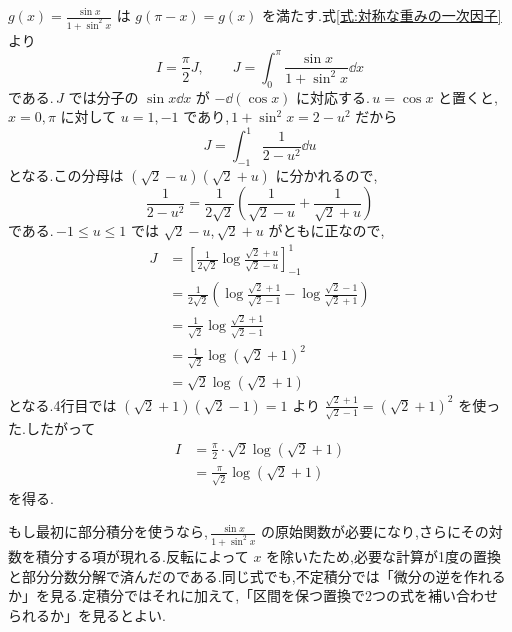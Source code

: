 $g(x)=\frac{\sin x}{1+\sin^2x}$ は $g(\pi-x)=g(x)$ を満たす.式\eqref{式:対称な重みの一次因子}より
\[
I=\frac{\pi}{2}J,\qquad
J=\int_0^\pi\frac{\sin x}{1+\sin^2x}\dd x
\]
である.\,$J$ では分子の $\sin x\dd x$ が $-\dd(\cos x)$ に対応する.\,$u=\cos x$ と置くと,\,$x=0,\pi$ に対して $u=1,-1$ であり,\,$1+\sin^2x=2-u^2$ だから
\[
J=\int_{-1}^1\frac{1}{2-u^2}\dd u
\]
となる.この分母は $(\sqrt2-u)(\sqrt2+u)$ に分かれるので,
\[
\frac{1}{2-u^2}
 =\frac{1}{2\sqrt2}\left(\frac{1}{\sqrt2-u}+\frac{1}{\sqrt2+u}\right)
\]
である.\,$-1\le u\le1$ では $\sqrt2-u$,\,$\sqrt2+u$ がともに正なので,
\[
\begin{aligned}
J&=\left[\frac{1}{2\sqrt2}
\log\frac{\sqrt2+u}{\sqrt2-u}\right]_{-1}^1\\
 &=\frac{1}{2\sqrt2}\left(\log\frac{\sqrt2+1}{\sqrt2-1}-\log\frac{\sqrt2-1}{\sqrt2+1}\right)\\
 &=\frac{1}{\sqrt2}\log\frac{\sqrt2+1}{\sqrt2-1}\\
 &=\frac{1}{\sqrt2}\log(\sqrt2+1)^2\\
 &=\sqrt2\log(\sqrt2+1)
\end{aligned}
\]
となる.4行目では $(\sqrt2+1)(\sqrt2-1)=1$ より $\frac{\sqrt2+1}{\sqrt2-1}=(\sqrt2+1)^2$ を使った.したがって
\[
\begin{aligned}
I&=\frac{\pi}{2}\cdot\sqrt2\log(\sqrt2+1)\\
 &=\frac{\pi}{\sqrt2}\log(\sqrt2+1)
\end{aligned}
\]
を得る.

もし最初に部分積分を使うなら,\,$\frac{\sin x}{1+\sin^2x}$ の原始関数が必要になり,さらにその対数を積分する項が現れる.反転によって $x$ を除いたため,必要な計算が1度の置換と部分分数分解で済んだのである.同じ式でも,不定積分では「微分の逆を作れるか」を見る.定積分ではそれに加えて,「区間を保つ置換で2つの式を補い合わせられるか」を見るとよい.
